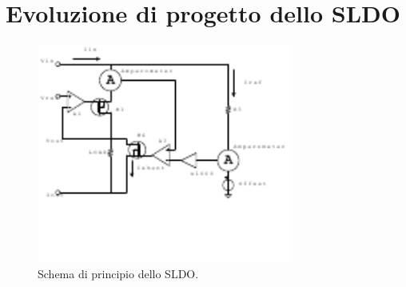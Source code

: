 

\section{Evoluzione di progetto dello SLDO}

\begin{figure}[!htbp]
\centering
\includegraphics[width=0.75\textwidth]{Immagini/SLDObase}
\caption{Schema di principio dello SLDO.}
\label{SLDOprova}
\end{figure}

